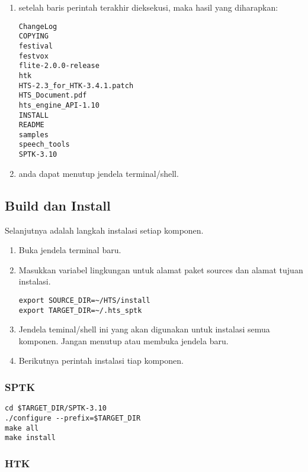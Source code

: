 \documentclass[12pt,]{article}
\begin{document}
\begin{enumerate}
		\item setelah baris perintah terakhir dieksekusi, maka hasil yang diharapkan:
		\begin{verbatim}
ChangeLog
COPYING
festival
festvox
flite-2.0.0-release
htk
HTS-2.3_for_HTK-3.4.1.patch
HTS_Document.pdf
hts_engine_API-1.10
INSTALL
README
samples
speech_tools
SPTK-3.10
		\end{verbatim}
		
		\item anda dapat menutup jendela terminal/shell.
		
	\end{enumerate}
	
	\newpage
	\subsection{Build dan Install}
	
	Selanjutnya adalah langkah instalasi setiap komponen.
	
	\begin{enumerate}
		\item Buka jendela terminal baru.
		
		\item Masukkan variabel lingkungan untuk alamat paket sources dan alamat tujuan instalasi.
		\begin{verbatim}
export SOURCE_DIR=~/HTS/install
export TARGET_DIR=~/.hts_sptk
		\end{verbatim}
		
		\item Jendela teminal/shell ini yang akan digunakan untuk instalasi semua komponen.
		Jangan menutup atau membuka jendela baru.
		
		\item Berikutnya perintah instalasi tiap komponen.
	\end{enumerate}

	\subsubsection{SPTK}
	\begin{verbatim}
cd $TARGET_DIR/SPTK-3.10
./configure --prefix=$TARGET_DIR
make all
make install
	\end{verbatim}
	
	\subsubsection{HTK}
	
\end{document}
